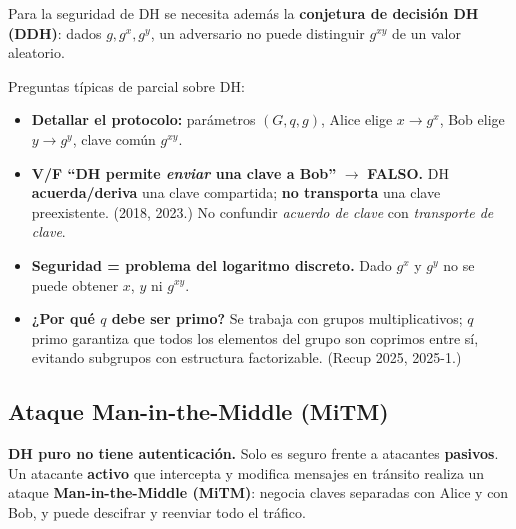 \documentclass[11pt,a4paper]{article}
\begin{document}
Para la seguridad de DH se necesita además la \textbf{conjetura de decisión DH
(DDH)}: dados $g, g^x, g^y$, un adversario no puede distinguir $g^{xy}$ de un
valor aleatorio.

\begin{examen}
Preguntas típicas de parcial sobre DH:
\begin{itemize}[leftmargin=1.4em,nosep]
  \item \textbf{Detallar el protocolo:} parámetros $(G, q, g)$, Alice elige $x \to
  g^x$, Bob elige $y \to g^y$, clave común $g^{xy}$.
  \item \textbf{V/F ``DH permite \emph{enviar} una clave a Bob''} $\to$ \textbf{FALSO.}
  DH \textbf{acuerda/deriva} una clave compartida; \textbf{no transporta} una clave
  preexistente. (2018, 2023.) No confundir \emph{acuerdo de clave} con
  \emph{transporte de clave}.
  \item \textbf{Seguridad = problema del logaritmo discreto.} Dado $g^x$ y $g^y$
  no se puede obtener $x$, $y$ ni $g^{xy}$.
  \item \textbf{¿Por qué $q$ debe ser primo?} Se trabaja con grupos multiplicativos;
  $q$ primo garantiza que todos los elementos del grupo son coprimos entre sí,
  evitando subgrupos con estructura factorizable. (Recup 2025, 2025-1.)
\end{itemize}
\end{examen}

\subsection{Ataque Man-in-the-Middle (MiTM)}

\begin{ojo}
\textbf{DH puro no tiene autenticación.} Solo es seguro frente a atacantes
\textbf{pasivos}. Un atacante \textbf{activo} que intercepta y modifica mensajes
en tránsito realiza un ataque \textbf{Man-in-the-Middle (MiTM)}: negocia claves
separadas con Alice y con Bob, y puede descifrar y reenviar todo el tráfico.
\end{ojo}
\end{document}
